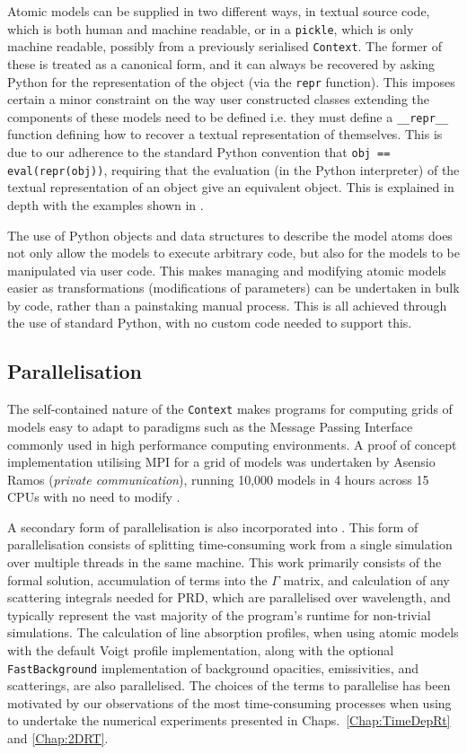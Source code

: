 Atomic models can be supplied in two different ways, in textual source code, which is both human and machine readable, or in a \texttt{pickle}, which is only machine readable, possibly from a previously serialised \texttt{Context}.
The former of these is treated as a canonical form, and it can always be recovered by asking Python for the representation of the object (via the \texttt{repr} function).
This imposes certain a minor constraint on the way user constructed classes extending the components of these models need to be defined i.e. they must define a \texttt{\_\_repr\_\_} function defining how to recover a textual representation of themselves.
This is due to our adherence to the standard Python convention that \texttt{obj == eval(repr(obj))}, requiring that the evaluation (in the Python interpreter) of the textual representation of an object give an equivalent object.
This is explained in depth with the examples shown in \citet{Osborne2021}.

The use of Python objects and data structures to describe the model atoms does not only allow the models to execute arbitrary code, but also for the models to be manipulated via user code.
This makes managing and modifying atomic models easier as transformations (modifications of parameters) can be undertaken in bulk by code, rather than a painstaking manual process.
This is all achieved through the use of standard Python, with no custom code needed to support this.

\subsection{Parallelisation}\label{Sec:LwParallelisation}

The self-contained nature of the \texttt{Context} makes \Lw{} programs for computing grids of models easy to adapt to paradigms such as the Message Passing Interface \citep[MPI, e.g.][for an overview of the MPICH implementation]{Gropp1996} commonly used in high performance computing environments.
A proof of concept implementation utilising MPI for a grid of models was undertaken by Asensio Ramos (\emph{private communication}), running 10,000 models in 4 hours across 15 CPUs with no need to modify \Lw{}.

A secondary form of parallelisation is also incorporated into \Lw{}.
This form of parallelisation consists of splitting time-consuming work from a single simulation over multiple threads in the same machine.
This work primarily consists of the formal solution, accumulation of terms into the $\Gamma$ matrix, and calculation of any scattering integrals needed for PRD, which are parallelised over wavelength, and typically represent the vast majority of the program's runtime for non-trivial simulations.
The calculation of line absorption profiles, when using atomic models with the default Voigt profile implementation, along with the optional \texttt{FastBackground} implementation of background opacities, emissivities, and scatterings, are also parallelised.
The choices of the terms to parallelise has been motivated by our observations of the most time-consuming processes when using \Lw{} to undertake the numerical experiments presented in Chaps.~\ref{Chap:TimeDepRt} and \ref{Chap:2DRT}.

